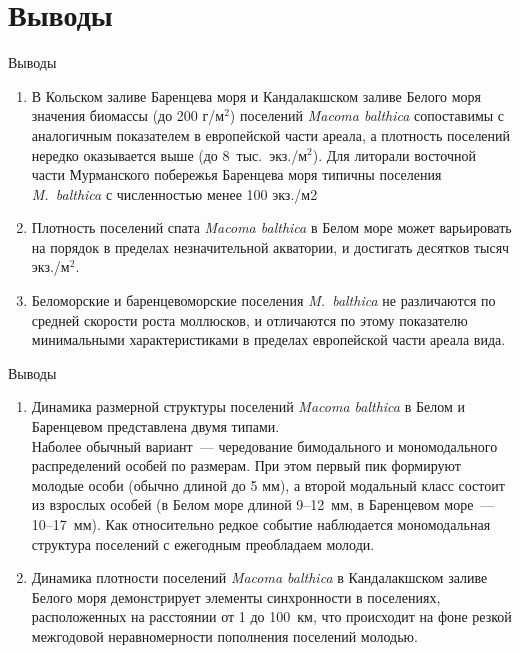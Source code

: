 \documentclass{beamer}
\begin{document}
		\section{Выводы}
\begin{small}

\begin{frame}{Выводы}
\addtocounter{enumi}{0}
	\begin{enumerate}
		\item В Кольском заливе Баренцева моря и Кандалакшском заливе  Белого моря значения биомассы (до 200 г/м$^2$) поселений {\it Macoma balthica} сопоставимы с аналогичным показателем в европейской части ареала, а плотность поселений нередко оказывается выше (до 8~тыс.~экз./м$^2$). Для литорали восточной части Мурманского побережья Баренцева моря типичны поселения {\it M.~balthica} с численностью менее 100 экз./м2 
		\item Плотность поселений спата {\it Macoma balthica} в Белом море может варьировать на порядок в пределах незначительной акватории, и достигать десятков тысяч экз./м$^2$.
		\item Беломорские и баренцевоморские поселения {\it M.~balthica} не различаются по средней скорости роста моллюсков, и отличаются по этому показателю минимальными характеристиками в пределах европейской части ареала вида. 
	\end{enumerate}
\end{frame}


\begin{frame}{Выводы}
	\begin{enumerate}
\addtocounter{enumi}{3}
		\item Динамика размерной структуры поселений {\it Macoma balthica} в Белом и Баренцевом представлена двумя типами. \\
Наболее обычный вариант~--- чередование бимодального и мономодального распределений особей по размерам. При этом первый пик формируют молодые
особи (обычно длиной до 5 мм), а второй модальный класс состоит из взрослых особей (в Белом море длиной 9--12~мм, в Баренцевом море~--- 10--17~мм).
Как относительно редкое событие наблюдается мономодальная структура поселений с ежегодным преобладаем молоди.
		\item Динамика плотности поселений {\it Macoma balthica} в Кандалакшском заливе Белого моря демонстрирует элементы синхронности в поселениях, расположенных на расстоянии от 1 до 100~км, что происходит на фоне резкой межгодовой неравномерности пополнения поселений молодью.  
	\end{enumerate}
\end{frame}


\end{small}
\end{document}
